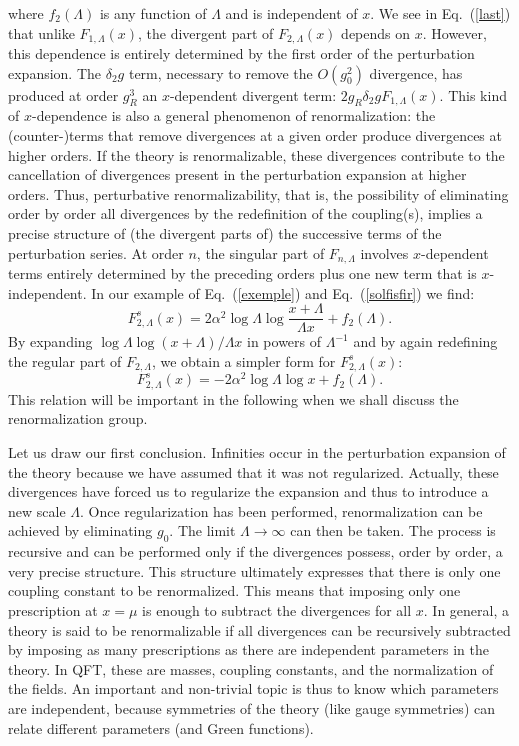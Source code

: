 \documentclass[floatfix,preprintnumbers,amsmath,amssymb,prb,12pt]{revtex4-1}
\begin{document}
where $f_2(\Lambda)$ is any function of $\Lambda$ and is
independent of $x$. We see in Eq.~(\ref{last}) that unlike
$F_{1,\Lambda}(x)$, the divergent part of $F_{2,\Lambda}(x)$
depends on $x$. However, this dependence is entirely determined by
the first order of the perturbation expansion. The 
$\delta_2g$ term, necessary to remove the $O(g_0^2)$ divergence, has 
produced at order $g_R^3$ an $x$-dependent divergent term: $2
g_R \delta_2 g F_{1,\Lambda}(x)$.
This kind of $x$-dependence is also a general phenomenon of
renormalization: the (counter-)terms that remove divergences at a
given order produce divergences at higher orders. If the theory is
renormalizable, these divergences contribute to the cancellation
of divergences present in the perturbation expansion at higher
orders. Thus, perturbative renormalizability, that is, the
possibility of eliminating order by order all divergences by the redefinition
of the coupling(s),
implies a precise structure of (the divergent parts of) the
successive terms of the perturbation series. At order $n$, the
singular part of
$F_{n,\Lambda}$ involves $x$-dependent terms entirely determined
by the preceding orders plus one new term that is
$x$-independent. In our example of Eq.~(\ref{exemple}) and
Eq.~(\ref{solfisfir}) we find:
\begin{equation}
F_{2,\Lambda}^s(x) = 2 \alpha^2 \log\Lambda
\log\frac{x+\Lambda}{\Lambda x}+ f_2(\Lambda).
\end{equation}
By expanding $\log\Lambda \log(x+\Lambda)/{\Lambda x}$ in powers
of $\Lambda^{-1}$ and by again redefining the regular part of
$F_{2,\Lambda}$, we obtain a simpler form for $F_{2,\Lambda}^s(x)$:
\begin{equation}
F_{2,\Lambda}^s(x) = -2 \alpha^2 \log\Lambda \log x+
f_2(\Lambda).
\label{solution2exemple}
\end{equation}
This relation will be important in the following when we shall
discuss the renormalization group. 

Let us draw our first conclusion. Infinities occur in the
perturbation expansion of the theory because we have assumed that
it was not regularized. Actually, these divergences have forced us
to regularize the expansion and thus to introduce a new scale
$\Lambda$. Once regularization has been performed, renormalization
can be achieved by eliminating $g_0$.
The limit $\Lambda\to\infty$ can then be taken. The process is
recursive and can be performed only if the divergences possess,
order by order, a very precise structure. This structure
ultimately expresses that there is only one coupling constant to
be renormalized. This means that imposing only one prescription at 
$x=\mu$ is enough to subtract the divergences for all $x$. In general, a
theory is said to be renormalizable if all divergences can be
recursively subtracted by imposing as many prescriptions as there
are independent parameters in the theory. In QFT, these are 
masses, coupling constants, and the normalization of the fields. An
important and non-trivial topic is thus to know which parameters
are independent, because symmetries of the theory (like gauge
symmetries) can relate different parameters (and Green functions). 
\end{document}
